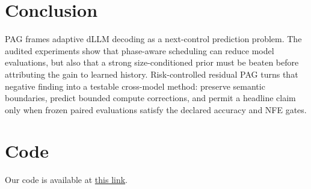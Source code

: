 \documentclass[11pt]{article}
\newcommand{\pag}{PAG}
\newcommand{\dllm}{dLLM}
\begin{document}
\section{Conclusion}
\pag{} frames adaptive \dllm{} decoding as a next-control prediction problem. The audited experiments show that phase-aware scheduling can reduce model evaluations, but also that a strong size-conditioned prior must be beaten before attributing the gain to learned history. Risk-controlled residual PAG turns that negative finding into a testable cross-model method: preserve semantic boundaries, predict bounded compute corrections, and permit a headline claim only when frozen paired evaluations satisfy the declared accuracy and NFE gates.

    \section{Code}
    Our code is available at \href{https://github.com/k-keshav-k/Phase-Assisted-Generation}{this link}.
\end{document}
